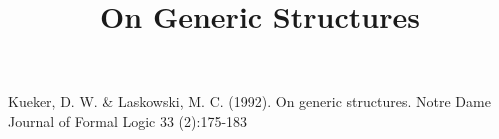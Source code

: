 \documentclass[a4paper]{article}
\title{On Generic Structures}
\date{}
\begin{document}
\maketitle
\par{Kueker, D. W. & Laskowski, M. C. (1992). On generic structures. Notre Dame Journal of Formal Logic 33 (2):175-183}
\printbibliography
\end{document}
